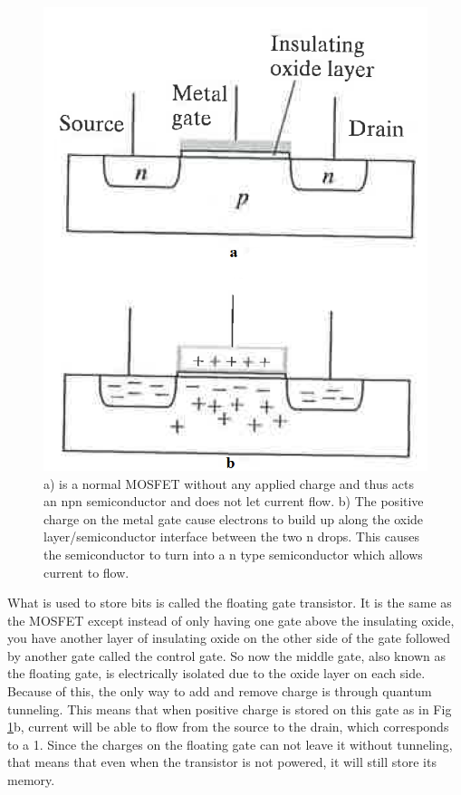 \documentclass[ notitlepage, numerical, 11pt]{revtex4-1} %
\begin{document}
\begin{figure}[H]
\centerline{\includegraphics[scale=.45]{mosfet.png}}
\caption{ a) is a normal MOSFET without any applied charge and thus acts an npn semiconductor and does not let current flow. b) The positive charge on the metal gate cause electrons to build up along the oxide layer/semiconductor interface between the two n drops. This causes the semiconductor to turn into a n type semiconductor which allows current to flow.}
\label{mosfet}
\end{figure}

What is used to store bits is called the floating gate transistor. It is the same as the MOSFET except instead of only having one gate above the insulating oxide, you have another layer of insulating oxide on the other side of the gate followed by another gate called the control gate. So now the middle gate, also known as the floating gate, is electrically isolated due to the oxide layer on each side. Because of this, the only way to add and remove charge is through quantum tunneling. This means that when positive charge is stored on this gate as in Fig \ref{mosfet}b, current will be able to flow from the source to the drain, which corresponds to a 1. Since the charges on the floating gate can not leave it without tunneling, that means that even when the transistor is not powered, it will still store its memory. 
\end{document}
